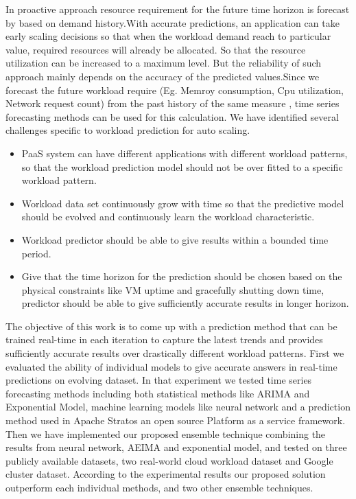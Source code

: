 In proactive approach resource requirement for the future time horizon is forecast by based on demand history.With accurate predictions, an application can take early scaling decisions so that when the workload demand reach to particular value, required resources will already be allocated. So that the resource  utilization can be increased to a maximum level. But the reliability of such approach mainly depends on the accuracy of the predicted values.Since we forecast the future workload require (Eg. Memroy consumption, Cpu utilization, Network request count) from the past history of the same measure , time series forecasting methods can be used for this calculation. 
We have identified several challenges specific to workload prediction for auto scaling.
\begin{itemize}
\item PaaS system can have different applications with different workload patterns, so that the workload prediction model should not be over fitted to a specific workload pattern.
\item Workload data set continuously grow with time so that the predictive model should be evolved and continuously learn the workload characteristic. 
\item Workload predictor should be able to give results within a bounded time period.
\item Give that the  time horizon for the prediction should be chosen based on the physical constraints like VM uptime and gracefully shutting down time, predictor should be able to give sufficiently accurate results in longer horizon.
\end{itemize}

The objective of this work is to come up with a prediction method that can be trained real-time in each iteration to capture the latest trends and provides sufficiently accurate results over drastically different workload patterns. First we evaluated the ability of individual models to give accurate answers in real-time predictions on evolving dataset. In that experiment we tested time series forecasting methods including both statistical methods like ARIMA and Exponential Model, machine learning models like neural network and a prediction method used in Apache Stratos an open source Platform as a service framework. Then we have implemented our proposed ensemble technique combining the results from neural network, AEIMA and exponential model, and tested on three publicly available datasets, two real-world cloud workload dataset and Google cluster dataset. According to the experimental results our proposed solution outperform each individual methods, and two other ensemble techniques.



